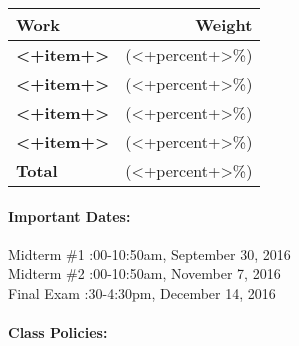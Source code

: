 \documentclass[11pt, a4paper]{article}
\begin{document}
\begin{table}[h]
\begin{tabularx}{\textwidth}{Xr}
\textbf{Work} & \textbf{Weight}\\
\hline
\textbf{<+item+>} & (<+percent+>\%) \\
\textbf{<+item+>} & (<+percent+>\%) \\
\textbf{<+item+>} & (<+percent+>\%) \\
\textbf{<+item+>} & (<+percent+>\%) \\
\hline
\textbf{Total} & (<+percent+>\%) \\
\end{tabularx}
\end{table}

\paragraph{Important Dates:}
\begin{center} \begin{minipage}{3.8in}
\begin{flushleft}
Midterm \#1      :00-10:50am, September 30, 2016  \\
Midterm \#2      :00-10:50am, November 7, 2016\\
Final Exam       :30-4:30pm, December 14, 2016\\
\end{flushleft}
\end{minipage}
\end{center}

\paragraph{Class Policies:}  
\end{document}

